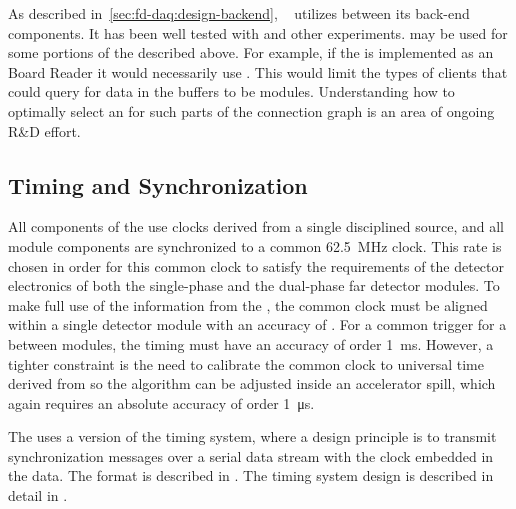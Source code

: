 As described in~\ref{sec:fd-daq:design-backend}, ~\cite{artdaq} utilizes   between its back-end components. 
It has been well tested with  and other experiments. 
 may be used for some portions of the   described above. 
For example, if the  is implemented as an  Board Reader it would necessarily use   . 
This would limit the types of clients that could query for data in the buffers to be  modules. 
Understanding how to optimally select an   for such parts of the  connection graph is an area of ongoing R\&D effort.

\subsection{Timing and Synchronization}
\label{sec:sp-daq:design-timing}

All components of the  use clocks derived from a single
 disciplined source, and all module components are
synchronized to a common \SI{62.5}{MHz} clock.
%
This rate is chosen in order for this common clock to satisfy the requirements of the detector electronics of both the single-phase and the dual-phase far detector modules.
%
To make full use of the information from the , the common clock must be aligned within a single detector %
module with an accuracy of . 
For a common trigger for a  between modules, the timing must have an accuracy of order \SI{1}{\milli\second}.
However, a tighter constraint is the need to calibrate the common clock to universal time derived from  so the  algorithm can be adjusted inside an accelerator spill, which again requires an absolute accuracy of order \SI{1}{\micro\second}.

The   uses a version of the  timing
system, where a design principle is to transmit synchronization messages over
a serial data stream with the clock embedded in the data. The format
is described in . The timing system design is
described in detail in .

